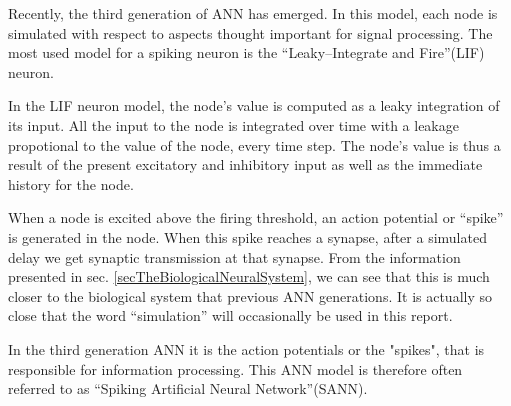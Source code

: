 %
%

Recently, the third generation of ANN has emerged. In this model, each node is simulated with respect to aspects thought important for signal processing\cite{Maass97networksof}.
The most used model for a spiking neuron is the ``Leaky--Integrate and Fire''(LIF) neuron\cite{florian03}. 

In the LIF neuron model, the node's value is computed as a leaky integration of its input. 
All the input to the node is integrated over time with a leakage propotional to the value of the node, every time step.
The node's value is thus a result of the present excitatory and inhibitory input as well as the immediate history for the node.

When a node is excited above the firing threshold, an action potential or ``spike'' is generated in the node. 
When this spike reaches a synapse, after a simulated delay we get synaptic transmission at that synapse.
From the information presented in sec. \ref{secTheBiologicalNeuralSystem}, we can see that this is much closer to the biological system that previous ANN generations.
It is actually so close that the word ``simulation'' will occasionally be used in this report.  	%

In the third generation ANN it is the action potentials or the "spikes", that is responsible for information processing.  %
This ANN model is therefore often referred to as ``Spiking Artificial Neural Network''(SANN).














